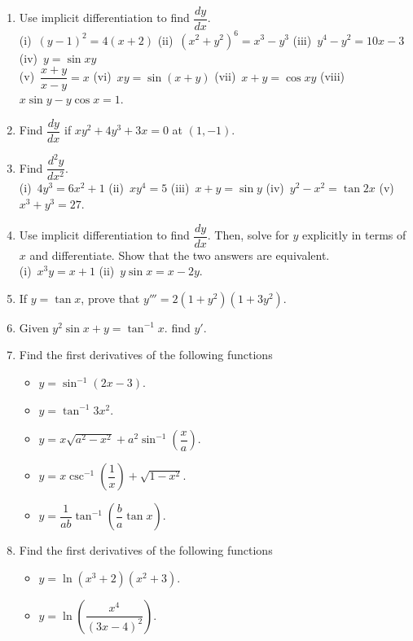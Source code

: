 \documentclass[titlepage,a4paper,12pt]{report}
\begin{document}
\begin{enumerate}
   (vi)\, $y=\dfrac{\sqrt[3]{x^4+6x^2}(8x+3)^5}{(2x^2+7)^{\frac{2}{3}}}$ \quad (vii)\, $y=(x^2+1)^{(x+1)^x}, x>-1$ \quad (viii)\, $y=x^x2^x$ \\ (ix)\, $y=x^{x^x}$ \quad (x)\, $y=x^{\cos x}$ \quad (xi)\, $y=x^{(x+1)^{\ln x}}$ \quad (xii)\, $y=(\ln x)^x$ \quad (xiii)\, $y=\dfrac{(x^2+1)^x}{x^2}$.
   \item Use implicit differentiation to find $\dfrac{dy}{dx}$.\\
   (i)\, $(y-1)^2=4(x+2)$ \quad (ii)\, $(x^2+y^2)^6=x^3-y^3$ \quad (iii)\, $y^4-y^2=10x-3$ \quad (iv)\, $y=\sin xy$\\
   (v)\, $\dfrac{x+y}{x-y}=x$ \quad (vi)\, $xy=\sin (x+y)$ \quad (vii)\, $x+y=\cos xy$ \quad (viii)\, $x\sin y-y\cos x=1$.
   \item Find $\dfrac{dy}{dx}$ if $xy^2+4y^3+3x=0$ at $(1,-1)$.
   \item Find $\dfrac{d^2y}{dx^2}$.\\
   (i)\, $4y^3=6x^2+1$ \quad (ii)\, $xy^4=5$ \quad (iii)\, $x+y=\sin y$ \quad (iv)\, $y^2-x^2=\tan 2x$ \quad  (v)\, $x^3+y^3=27$.
   \item Use implicit differentiation to find $\dfrac{dy}{dx}$. Then, solve for $y$ explicitly in terms of $x$ and differentiate. Show that the two answers are equivalent.\\
   (i)\, $x^3y=x+1$ \quad (ii)\, $y\sin x =x-2y$.
   \item If $y=\tan x$, prove that $y'''=2(1+y^2)(1+3y^2)$.
   \item Given $y^2\sin x +y =\tan ^{-1} x$. find $y'$.
   \item Find the first derivatives of the following functions 
   \begin{itemize}
   \item[(i)] $y=\sin ^{-1} (2x-3)$.
   \item[(ii)] $y=\tan ^{-1} 3x^2$.
   \item[(iii)] $y=x\sqrt{a^2-x^2}+a^2\sin ^{-1} \left(\dfrac{x}{a}\right)$.
   \item[(iv)] $y=x\csc ^{-1} \left(\dfrac{1}{x}\right) +\sqrt{1-x^2}$.
   \item[(v)] $y=\dfrac{1}{ab}\tan ^{-1}\left(\dfrac{b}{a} \tan x\right)$.
\end{itemize} 
\item Find the first derivatives of the following functions 
\begin{itemize}
\item[(i)] $y=\ln (x^3+2)(x^2+3)$.
\item[(ii)] $y=\ln \left(\dfrac{x^4}{(3x-4)^2}\right)$.

\end{itemize}
\end{enumerate}
\end{document}
